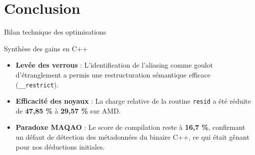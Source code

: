 \section[Conclusion]{Conclusion}

\begin{frame}{Bilan technique des optimisations}
    \begin{block}{Synthèse des gains en C++}
        \fontsize{8}{9}\selectfont
        \begin{itemize}
            \item \textbf{Levée des verrous} : L'identification de l'aliasing comme goulot d'étranglement a permis une restructuration sémantique efficace (\texttt{\_\_restrict}).
            \item \textbf{Efficacité des noyaux} : La charge relative de la routine \texttt{resid} a été réduite de \textbf{47,85 \%} à \textbf{29,57 \%} sur AMD.
            \item \textbf{Paradoxe MAQAO} : Le score de compilation reste à \textbf{16,7 \%}, confirmant un défaut de détection des métadonnées du binaire C++, ce qui était gênant pour nos déductions initiales.
        \end{itemize}
    \end{block}
\end{frame}



